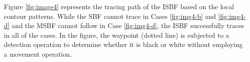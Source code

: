 \documentclass[sensors,article,accept,moreauthors,pdftex,10pt,a4paper]{mdpi}
\begin{document}

Figure \ref{fig:image4} represents the tracing path of the ISBF based on the local contour patterns. While the SBF cannot trace in Cases \ref{fig:img4-b} and \ref{fig:img4-d} and the MSBF cannot follow in Case \ref{fig:img4-d}, the ISBF successfully traces in all of the cases. In the figure, the waypoint (dotted line) is subjected to a detection operation to determine whether it is black or white without employing a movement operation.
\end{document}
